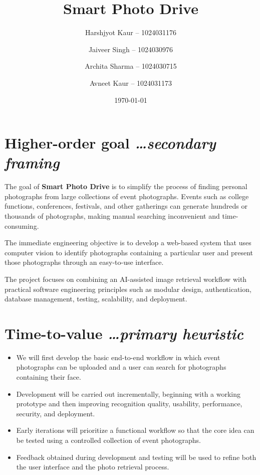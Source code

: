 \documentclass[11pt,a4paper]{article}
\title{Smart Photo Drive}
\author{
  Harshjyot Kaur -- 1024031176
  \and
  Jaiveer Singh -- 1024030976
  \and
  Archita Sharma -- 1024030715
  \and
  Avneet Kaur -- 1024031173
}
\date{\today}
\newcommand{\BvrHint}[1]{%
  {\normalfont\normalsize\itshape\hfill #1}}
\begin{document}
\maketitle

\section{Higher-order goal%
  \BvrHint{\ldots secondary framing}}

The goal of \textbf{Smart Photo Drive} is to simplify the process of
finding personal photographs from large collections of event
photographs. Events such as college functions, conferences,
festivals, and other gatherings can generate hundreds or thousands of
photographs, making manual searching inconvenient and time-consuming.

The immediate engineering objective is to develop a web-based system
that uses computer vision to identify photographs containing a
particular user and present those photographs through an easy-to-use
interface.

The project focuses on combining an AI-assisted image retrieval
workflow with practical software engineering principles such as
modular design, authentication, database management, testing,
scalability, and deployment.

\section{Time-to-value%
  \BvrHint{\ldots primary heuristic}}

\begin{itemize}[leftmargin=0.7cm]

    \item We will first develop the basic end-to-end workflow in which
    event photographs can be uploaded and a user can search for
    photographs containing their face.

    \item Development will be carried out incrementally, beginning with
    a working prototype and then improving recognition quality,
    usability, performance, security, and deployment.

    \item Early iterations will prioritize a functional workflow so
    that the core idea can be tested using a controlled collection of
    event photographs.

    \item Feedback obtained during development and testing will be used
    to refine both the user interface and the photo retrieval process.

\end{itemize}
\end{document}
